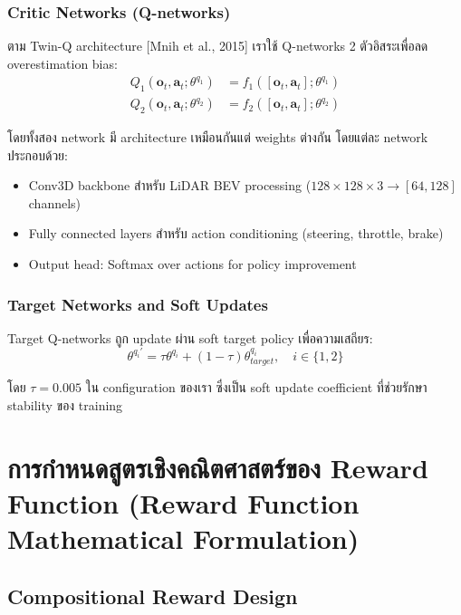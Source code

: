 \documentclass[10pt,a4paper,twocolumn]{article}
\begin{document}
\subsubsection{Critic Networks (Q-networks)}
ตาม Twin-Q architecture [Mnih et al., 2015] เราใช้ Q-networks 2 ตัวอิสระเพื่อลด overestimation bias:
\begin{align}\label{eq:twin-q-networks}
    Q_1(\mathbf{o}_t, \mathbf{a}_t; \theta^{q_1}) &= f_1([\mathbf{o}_t, \mathbf{a}_t]; \theta^{q_1}) \\
    Q_2(\mathbf{o}_t, \mathbf{a}_t; \theta^{q_2}) &= f_2([\mathbf{o}_t, \mathbf{a}_t]; \theta^{q_2})
\end{align}

โดยทั้งสอง network มี architecture เหมือนกันแต่ weights ต่างกัน โดยแต่ละ network ประกอบด้วย:
\begin{itemize}
    \item Conv3D backbone สำหรับ LiDAR BEV processing ($128\times128 \times 3 \rightarrow [64, 128]$ channels)
    \item Fully connected layers สำหรับ action conditioning (steering, throttle, brake)
    \item Output head: Softmax over actions for policy improvement
\end{itemize}

\subsubsection{Target Networks and Soft Updates}
Target Q-networks ถูก update ผ่าน soft target policy เพื่อความเสถียร:
\begin{equation}\label{eq:soft-target-update}
    \theta^{q_i'} = \tau \theta^{q_i} + (1-\tau) \theta^{q_i}_{target}, \quad i \in \{1,2\}
\end{equation}

โดย $\tau = 0.005$ ใน configuration ของเรา ซึ่งเป็น soft update coefficient ที่ช่วยรักษา stability ของ training

\section{การกำหนดสูตรเชิงคณิตศาสตร์ของ Reward Function (Reward Function Mathematical Formulation)}

\subsection{Compositional Reward Design}
\end{document}
